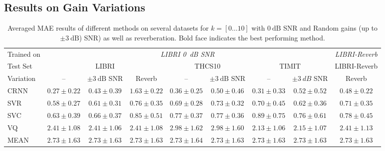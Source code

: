 \subsection{Results on Gain Variations}%
\label{ssec:exp_random_gains}
%
\begin{table*}[h]
\caption{Averaged MAE results of different methods on several datasets for \( k = [0 \ldots 10] \) with $0~\mbox{dB}$ SNR and Random gains (up to $\pm 3~\mbox{dB}$) SNR) as well as reverberation. Bold face indicates the best performing method.}
\begin{center}
\begin{tabular}{lcccccccc}
\toprule
Trained on & \multicolumn{7}{c}{\emph{LIBRI 0~dB SNR}} & \multicolumn{1}{c}{\emph{LIBRI-Reverb}} \\
\cmidrule(r){2-8} \cmidrule(r){9-9}
Test Set & \multicolumn{3}{c}{LIBRI} & \multicolumn{2}{c}{THCS10} & \multicolumn{2}{c}{TIMIT} & \multicolumn{1}{c}{LIBRI-Reverb} \\
\cmidrule(r){2-4} \cmidrule(r){5-6} \cmidrule(r){7-8} \cmidrule(r){9-9}
Variation &     – &     $\pm 3~\mbox{dB}$ SNR  & Reverb &  – &     $\pm 3~\mbox{dB}$ SNR  &     – &  $\pm 3~dB$ SNR & Reverb \\
\midrule
CRNN    &  $\mathbf{0.27 \pm{0.22}}$ & $\mathbf{0.43 \pm{0.39}}$ & $1.63 \pm{0.22}$ & $\mathbf{0.36 \pm{0.25}}$  & $\mathbf{0.50 \pm{0.46}}$ & $\mathbf{0.31 \pm{0.33}}$ & $\mathbf{0.52 \pm{0.52}}$  &  $\mathbf{0.48 \pm{0.22}}$\\
SVR     &  $0.58 \pm{0.27}$ & $0.61 \pm{0.31}$ & $\mathbf{0.76 \pm{0.35}}$ & $0.69 \pm{0.28}$ &  $0.73 \pm{0.32}$ & $0.70 \pm{0.45}$ & $0.62 \pm{0.36}$ & $0.71 \pm{0.35}$ \\
SVC     &  $0.63 \pm{0.39}$ & $0.66 \pm{0.37}$ & $0.85 \pm{0.51}$ & $0.77 \pm{0.37}$ &  $0.77 \pm{0.36}$ & $0.89 \pm{0.75}$ & $0.76 \pm{0.61}$ & $0.78 \pm{0.45}$ \\
VQ \cite{sayoud10} &  $2.41 \pm{1.08}$ & $2.41 \pm{1.06}$ & $2.41 \pm{1.08}$ & $2.98 \pm{1.62}$ &  $2.98 \pm{1.60}$ & $2.13 \pm{1.06}$ & $2.15 \pm{1.07}$ & $2.41 \pm{1.13}$ \\
MEAN    &  $2.73 \pm{1.63}$ & $2.73 \pm{1.63}$ & $2.73 \pm{1.63}$ & $2.73 \pm{1.64}$ &  $2.73 \pm{1.63}$ & $2.73 \pm{1.63}$ & $2.73 \pm{1.63}$ & $2.73 \pm{1.63}$ \\
\bottomrule
\end{tabular}
\end{center}
\label{tab:expgainreverb}
\end{table*}
